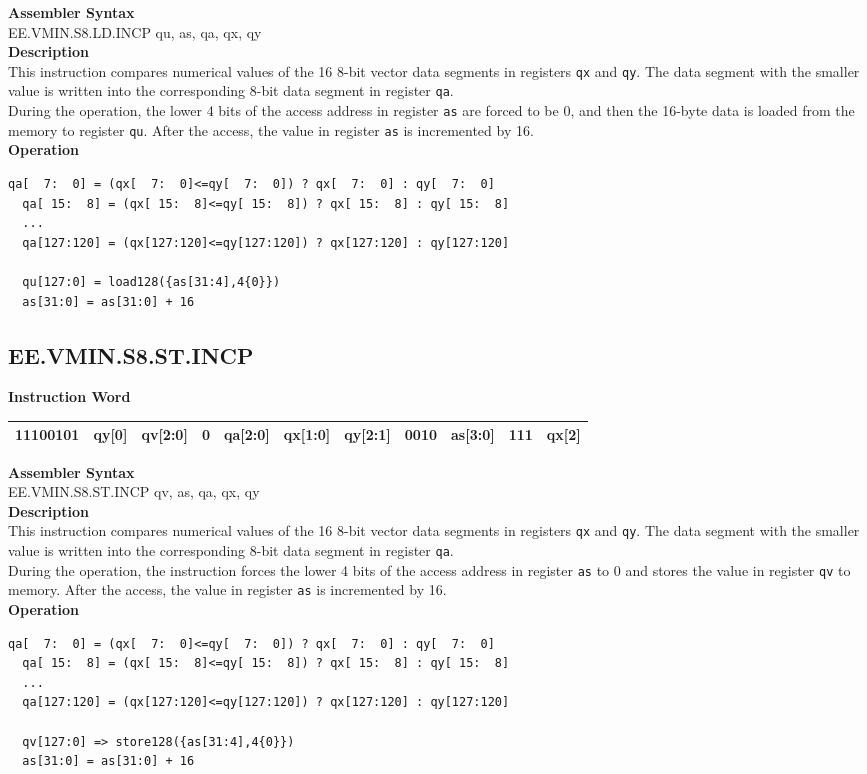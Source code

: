 \textbf{Assembler Syntax} \\
EE.VMIN.S8.LD.INCP qu, as, qa, qx, qy \\
\textbf{Description} \\
This instruction compares numerical values of the 16 8-bit vector data segments in registers \lstinline{qx} and \lstinline{qy}. The data segment with the smaller value is written into the corresponding 8-bit data segment in register \lstinline{qa}.\\
During the operation, the lower 4 bits of the access address in register \lstinline{as} are forced to be 0, and then the 16-byte data is loaded from the memory to register \lstinline{qu}. After the access, the value in register \lstinline{as} is incremented by 16.\\
\textbf{Operation}
\begin{lstlisting}[escapeinside=`?]
  qa[  7:  0] = (qx[  7:  0]<=qy[  7:  0]) ? qx[  7:  0] : qy[  7:  0]
  qa[ 15:  8] = (qx[ 15:  8]<=qy[ 15:  8]) ? qx[ 15:  8] : qy[ 15:  8]
  ...
  qa[127:120] = (qx[127:120]<=qy[127:120]) ? qx[127:120] : qy[127:120]

  qu[127:0] = load128({as[31:4],4{0}})
  as[31:0] = as[31:0] + 16
\end{lstlisting}

\clearpage
\subsection{EE.VMIN.S8.ST.INCP}\label{instruction:EEVMINS8STINCP}
\setlength\tabcolsep{6pt}
\textbf{Instruction Word} \\
\begin{tabular}{|c|c|c|c|c|c|c|c|c|c|c|}
	\hline
	11100101 & qy[0] & qv[2:0] & 0 & qa[2:0] & qx[1:0] & qy[2:1] & 0010 & as[3:0] & 111 & qx[2] \\
	\hline
\end{tabular}

\textbf{Assembler Syntax} \\
EE.VMIN.S8.ST.INCP qv, as, qa, qx, qy \\
\textbf{Description} \\
This instruction compares numerical values of the 16 8-bit vector data segments in registers \lstinline{qx} and \lstinline{qy}. The data segment with the smaller value is written into the corresponding 8-bit data segment in register \lstinline{qa}.\\
During the operation, the instruction forces the lower 4 bits of the access address in register \lstinline{as} to 0 and stores the value in register \lstinline{qv} to memory. After the access, the value in register \lstinline{as} is incremented by 16.\\
\textbf{Operation}
\begin{lstlisting}[escapeinside=`?]
  qa[  7:  0] = (qx[  7:  0]<=qy[  7:  0]) ? qx[  7:  0] : qy[  7:  0]
  qa[ 15:  8] = (qx[ 15:  8]<=qy[ 15:  8]) ? qx[ 15:  8] : qy[ 15:  8]
  ...
  qa[127:120] = (qx[127:120]<=qy[127:120]) ? qx[127:120] : qy[127:120]

  qv[127:0] => store128({as[31:4],4{0}})
  as[31:0] = as[31:0] + 16
\end{lstlisting}

